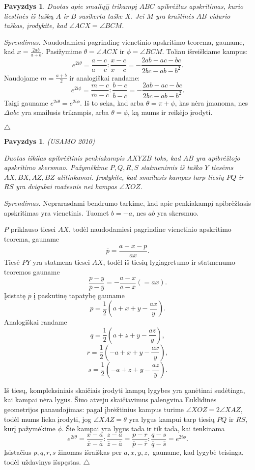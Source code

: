 \documentclass[11pt,a4paper,twoside]{book}
\newenvironment{sprendimas}{\noindent \textit{Sprendimas.}}{\hfill $\triangle$}
\newcounter{foo}[subsection]
\newtheorem{pavnr}[foo]{Pavyzdys}
\theoremstyle{definition} \newtheorem*{api}{Apibrėžimas}
\theoremstyle{remark} \newtheorem*{pastaba}{Pastaba}
\begin{document}
\begin{pavnr} 
Duotas apie smailųjį trikampį $ABC$ apibrėžtas apskritimas, kurio liestinės iš taškų $A$ ir $B$ susikerta taške $X$. Jei $M$ yra kraštinės $AB$ vidurio taškas, įrodykite, kad $\angle ACX = \angle BCM$.
\end{pavnr}
\begin{sprendimas}
Naudodamiesi pagrindinę vienetinio apskritimo teorema, gauname, kad $ x= \frac {2ab}{a+b}$. Pasižymime $\theta = \angle ACX$ ir $\phi = \angle BCM$. Toliau išreiškiame kampus:
$$ e^{ 2i\theta} = \frac { a-c}{ \bar a - \bar c} : \frac {x-c}{\bar x - \bar c}=
- \frac { 2ab -ac-bc}{2bc - ab- b^2}.$$
Naudojame $m = \frac {a+b}{2}$ ir analogiškai randame:
$$ e^{2i\phi} = \frac { m-c}{ \bar m - \bar c} : \frac {b-c}{\bar b - \bar c}=
- \frac { 2ab -ac-bc}{2bc - ab- b^2}.$$
Taigi gauname $ e^{ 2i\theta} = e^{2i\phi}$. Iš to seka, kad arba $ \theta = \pi + \phi$, kas nėra įmanoma, nes $\Delta abc$ yra smailusis trikampis, arba $\theta =\phi$, ką mums ir reikėjo įrodyti.

\end{sprendimas}






\begin{pavnr}
(USAMO 2010) 

Duotas iškilas apibrėžtinis penkiakampis $AXYZB$ toks, kad $AB$ yra apibrėžtojo apskritimo skersmuo. Pažymėkime $P, Q, R, S$ statmenimis iš taško $Y$ tiesėms  $AX, BX, AZ, BZ$ atitinkamai. Įrodykite, kad smailusis kampas tarp tiesių $PQ$ ir $RS$ yra dvigubai mažesnis nei kampas $\angle XOZ$.
\end{pavnr}
\begin{sprendimas}
  Neprarasdami bendrumo tarkime, kad apie penkiakampį apibrėžtasis apskritimas yra vienetinis. Tuomet $b = -a$, nes $ab$ yra skersmuo. 

$P$ priklauso tiesei $AX$, todėl naudodamiesi pagrindine vienetinio apskritimo teorema, gauname $$\overline{p}=\frac{a+x-p}{ax}.$$ Tiesė $PY$ yra statmena tiesei $AX$, todėl iš tiesių lygiagretumo ir statmenumo teoremos gauname $$\frac{p-y}{\overline{p}-\overline{y}}=-\frac{a-x}{\overline{a}-\overline{x}} (=ax).$$ 
Įsistatę $\overline{p}$ į paskutinę tapatybę gauname 
$$p = \frac {1}{2}( a+x+y- \frac {ax}{y}).$$
Analogiškai randame
$$q = \frac {1}{2}( a+z+y- \frac {az}{y}),$$ 
$$r = \frac {1}{2}( -a+x+y- \frac {ax}{y}),$$
$$s = \frac {1}{2}( -a+z+y- \frac {az}{y}).$$

Iš tiesų, kompleksiniais skaičiais įrodyti kampų lygybes yra ganėtinai sudėtinga, kai kampai nėra lygūs. Šiuo atveju skaičiavimus palengvina Euklidinės geometrijos panaudojimas: pagal įbrėžtinius kampus turime $\angle XOZ = 2\angle XAZ$, todėl mums lieka įrodyti, jog  $\angle XAZ=\theta$ yra lygus kampui tarp tiesių $PQ$ ir $RS$, kurį pažymėkime $\phi$. Šie kampai yra lygūs tada ir tik tada, kai tenkinama 
$$e^{2i\theta}=\frac {x-a} {\bar x - \bar a} : \frac{z-a}{\bar z - \bar a} = \frac{p-r}{\bar p - \bar r} : \frac{q-s}{\bar q - \bar s}=e^{2i\phi}.$$
Įsistačius $p, q, r, s$ žinomas išraiškas per $a, x, y, z,$ gauname, kad lygybė teisinga, todėl uždavinys išspęstas.
\end{sprendimas}
     
\end{document}
